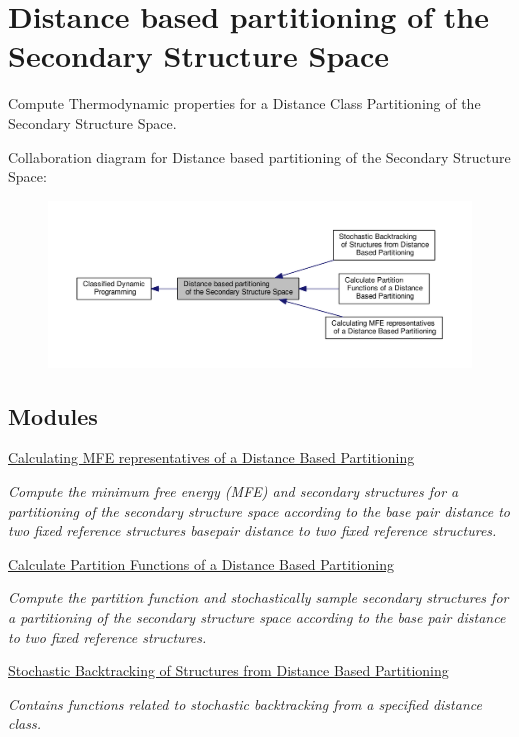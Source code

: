 \hypertarget{group__kl__neighborhood}{\section{Distance based partitioning of the Secondary Structure Space}
\label{group__kl__neighborhood}
}


Compute Thermodynamic properties for a Distance Class Partitioning of the Secondary Structure Space.  


Collaboration diagram for Distance based partitioning of the Secondary Structure Space\-:
\nopagebreak
\begin{figure}[H]
\begin{center}
\leavevmode
\includegraphics[width=350pt]{group__kl__neighborhood}
\end{center}
\end{figure}
\subsection*{Modules}
\begin{DoxyCompactItemize}
\item 
\hyperlink{group__kl__neighborhood__mfe}{Calculating M\-F\-E representatives of a Distance Based Partitioning}
\begin{DoxyCompactList}\small\item\em Compute the minimum free energy (M\-F\-E) and secondary structures for a partitioning of the secondary structure space according to the base pair distance to two fixed reference structures basepair distance to two fixed reference structures. \end{DoxyCompactList}\item 
\hyperlink{group__kl__neighborhood__pf}{Calculate Partition Functions of a Distance Based Partitioning}
\begin{DoxyCompactList}\small\item\em Compute the partition function and stochastically sample secondary structures for a partitioning of the secondary structure space according to the base pair distance to two fixed reference structures. \end{DoxyCompactList}\item 
\hyperlink{group__kl__neighborhood__stochbt}{Stochastic Backtracking of Structures from Distance Based Partitioning}
\begin{DoxyCompactList}\small\item\em Contains functions related to stochastic backtracking from a specified distance class. \end{DoxyCompactList}\end{DoxyCompactItemize}


